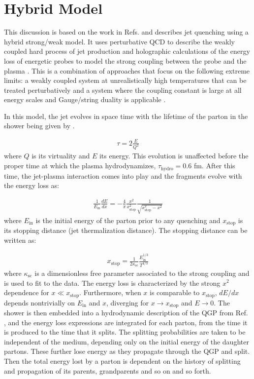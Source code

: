 \section{Hybrid Model}
This discussion is based on the work in Refs. \cite{Casalderrey-Solana:2014bpa, Hulcher2018, Casalderrey-Solana:2016jvj} and describes jet quenching using a hybrid strong/weak model. It uses perturbative QCD to describe the weakly coupled hard process of jet production and holographic calculations of the energy loss of energetic probes to model the strong coupling between the probe and the plasma \cite{Chesler:2015nqz, Chesler:2014jva}. This is a combination of approaches that focus on the following extreme limits: a weakly coupled system at unrealistically high temperatures that can be treated perturbatively \cite{Jacobs:2004qv, Majumder:2010qh} and a system where the coupling constant is large at all energy scales and Gauge/string duality is applicable \cite{CasalderreySolana:2011us}.

In this model, the jet evolves in space time with the lifetime of the parton in the shower being given by \cite{CasalderreySolana:2011gx}.  

\begin{align}
\tau = 2 \frac{E}{Q^2}
\end{align}
where $Q$ is its virtuality and $E$ its energy. This evolution is unaffected before the proper time at which the plasma hydrodynamizes, $\tau_{\text{hydro}} = 0.6$ fm. After this time, the jet-plasma interaction comes into play and the fragments evolve with the energy loss as:

\begin{align}
\frac{1}{E_{\mathrm{in}}} \frac{dE}{dx} = -\frac{4}{\pi} \frac{x^2}{x_{\mathrm{stop}}^2} \frac{1}{\sqrt{x_{\mathrm{stop}}^2 - x^2}}
\end{align}
where $E_{\mathrm{in}}$ is the initial energy of the parton prior to any quenching and $x_{\mathrm{stop}}$ is its stopping distance (jet thermalization distance). The stopping distance can be written as:

\begin{align}
x_\mathrm{stop} = \frac{1}{2\kappa_\mathrm{sc}} \frac{E_\mathrm{in}^{1/3}}{T^{4/3}}
\end{align}
where $\kappa_\mathrm{sc}$ is a dimensionless free parameter associated to the strong coupling and is used to fit to the data. The energy loss is characterized by the strong  $x^2$ dependence for $x \ll x_\mathrm{stop}$. Furthermore, when $x$ is comparable to $x_\mathrm{stop}$, $dE/dx$ depends nontrivially on $E_\mathrm{in}$ and $x$, diverging for $x\rightarrow x_\mathrm{stop}$ and $E\rightarrow0$. The shower is then embedded into a hydrodynamic description of the QGP from Ref. \cite{Hirano:2010je}, and the energy loss expressions are integrated for each parton, from the time it is produced to the time that it splits. The splitting probabilities are taken to be independent of the medium, depending only on the initial energy of the daughter partons. These further lose energy as they propagate through the QGP and split. Then the total energy lost by a parton is dependent on the history of splitting and propagation of its parents, grandparents and so on and so forth. 

